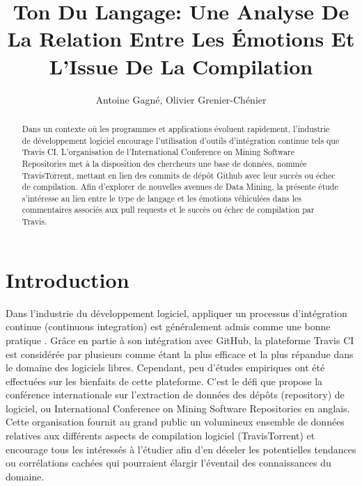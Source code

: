 \documentclass[10pt, conference]{IEEEtran}
\title{Ton Du Langage: Une Analyse De La Relation Entre Les Émotions Et L'Issue De La Compilation}
\author{Antoine Gagné, Olivier Grenier-Chénier}
\begin{document}
\maketitle

\begin{abstract}
Dans un contexte où les programmes et applications évoluent rapidement, l'industrie de développement logiciel encourage l'utilisation d'outils d'intégration continue tels que Travis CI. L'organisation de l'International Conference on Mining Software Repositories met à la disposition des chercheurs une base de données, nommée TravisTorrent, mettant en lien des commits de dépôt Github avec leur succès ou échec de compilation. Afin d'explorer de nouvelles avenues de Data Mining, la présente étude s'intéresse au lien entre le type de langage et les émotions véhiculées dans les commentaires associés aux pull requests et le succès ou échec de compilation par Travis.
\end{abstract}


\section{Introduction}
\label{sec:introduction}
Dans l’industrie du développement logiciel, appliquer un processus d’intégration continue (continuous integration) est généralement admis comme une bonne pratique \cite{c3}. Grâce en partie à son intégration avec GitHub, la plateforme Travis CI est considérée par plusieurs comme étant la plus efficace et la plus répandue dans le domaine des logiciels libres. Cependant, peu d’études empiriques ont été effectuées sur les bienfaits de cette plateforme. C’est le défi que propose la conférence internationale sur l’extraction de données des dépôts (repository) de logiciel, ou International Conference on Mining Software Repositories \cite{c2} en anglais. Cette organisation fournit au grand public un volumineux ensemble de données relatives aux différents aspects de compilation logiciel (TravisTorrent) et encourage tous les intéressés à l’étudier afin d’en déceler les potentielles tendances ou corrélations cachées qui pourraient élargir l’éventail des connaissances du domaine. 
\end{document}
